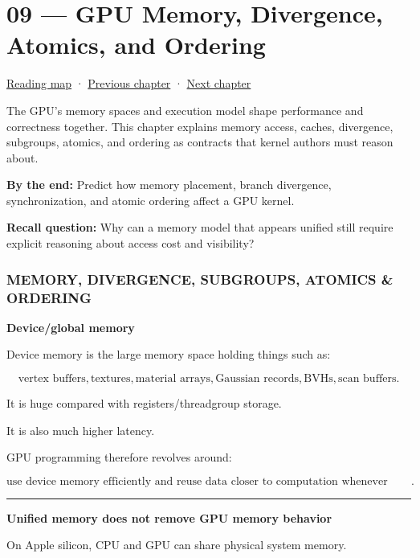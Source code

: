 \hypertarget{01-foundations-i-ch009}{}
\chapter{09 --- GPU Memory, Divergence, Atomics, and Ordering}\label{01-foundations-i-ch009-gpu-memory-divergence-atomics-and-ordering}

\hyperref[volume-reading-map]{Reading map} · \hyperref[01-foundations-i-ch008]{Previous chapter} · \hyperref[01-foundations-i-ch010]{Next chapter}

The GPU's memory spaces and execution model shape performance and correctness together. This chapter explains memory access, caches, divergence, subgroups, atomics, and ordering as contracts that kernel authors must reason about.

\textbf{By the end:} Predict how memory placement, branch divergence, synchronization, and atomic ordering affect a GPU kernel.

\textbf{Recall question:} Why can a memory model that appears unified still require explicit reasoning about access cost and visibility?

\subsection{MEMORY, DIVERGENCE, SUBGROUPS, ATOMICS \& ORDERING}\label{01-foundations-i-ch009-memory-divergence-subgroups-atomics-ordering}

\textbf{Device/global memory}

Device memory is the large memory space holding things such as:

\[
\text{vertex buffers},
\text{textures},
\text{material arrays},
\text{Gaussian records},
\text{BVHs},
\text{scan buffers}.
\]

It is huge compared with registers/threadgroup storage.

It is also much higher latency.

GPU programming therefore revolves around:

\[
\boxed{
\text{use device memory efficiently and reuse data closer to computation whenever possible}.
}
\]

\begin{center}\rule{0.5\linewidth}{0.5pt}\end{center}

\textbf{Unified memory does not remove GPU memory behavior}

On Apple silicon, CPU and GPU can share physical system memory.

